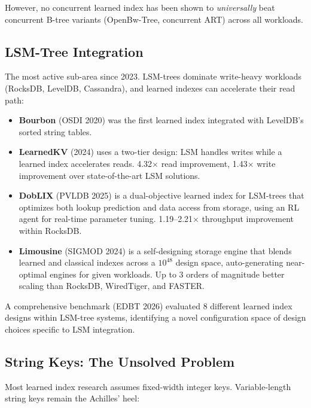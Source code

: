 \documentclass[11pt, a4paper]{article}
\begin{document}
However, no concurrent learned index has been shown to \emph{universally}
beat concurrent B-tree variants (OpenBw-Tree, concurrent ART) across
all workloads.

\subsection{LSM-Tree Integration}

The most active sub-area since 2023. LSM-trees dominate write-heavy
workloads (RocksDB, LevelDB, Cassandra), and learned indexes can
accelerate their read path:

\begin{itemize}[nosep]
    \item \textbf{Bourbon} (OSDI 2020) was the first learned index
        integrated with LevelDB's sorted string tables.
    \item \textbf{LearnedKV} (2024) uses a two-tier design: LSM handles
        writes while a learned index accelerates reads. 4.32$\times$ read
        improvement, 1.43$\times$ write improvement over state-of-the-art
        LSM solutions.
    \item \textbf{DobLIX} (PVLDB 2025) is a dual-objective learned index
        for LSM-trees that optimizes both lookup prediction and data access
        from storage, using an RL agent for real-time parameter tuning.
        1.19--2.21$\times$ throughput improvement within RocksDB.
    \item \textbf{Limousine} (SIGMOD 2024) is a self-designing storage
        engine that blends learned and classical indexes across a
        $10^{48}$ design space, auto-generating near-optimal engines for
        given workloads. Up to 3 orders of magnitude better scaling than
        RocksDB, WiredTiger, and FASTER.
\end{itemize}

A comprehensive benchmark (EDBT 2026) evaluated 8 different learned index
designs within LSM-tree systems, identifying a novel configuration space
of design choices specific to LSM integration.

\subsection{String Keys: The Unsolved Problem}

Most learned index research assumes fixed-width integer keys. Variable-length
string keys remain the Achilles' heel:
\end{document}
